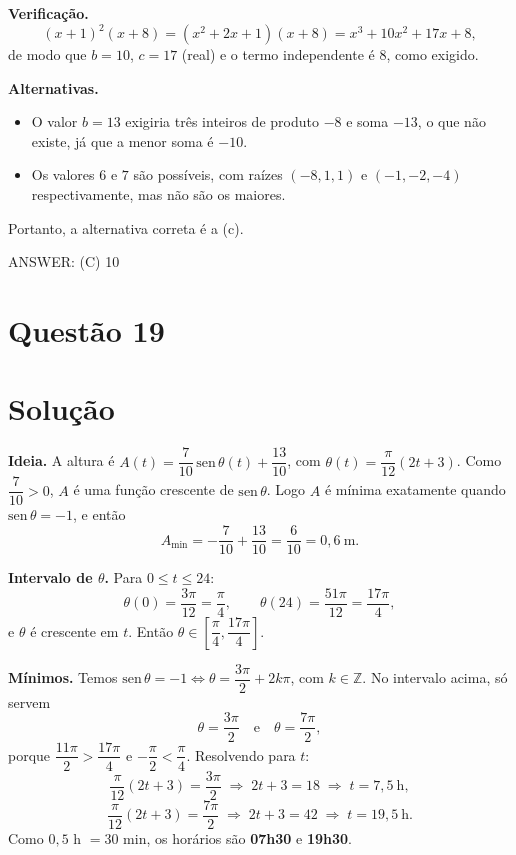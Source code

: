 \documentclass{article}%
\begin{document}
\textbf{Verificação.}
\[
(x+1)^2(x+8)=(x^2+2x+1)(x+8)=x^3+10x^2+17x+8,
\]
de modo que $b=10$, $c=17$ (real) e o termo independente é $8$, como exigido.

\textbf{Alternativas.}
\begin{itemize}
\item O valor $b=13$ exigiria três inteiros de produto $-8$ e soma $-13$, o que não existe, já que a menor soma é $-10$.
\item Os valores $6$ e $7$ são possíveis, com raízes $(-8,1,1)$ e $(-1,-2,-4)$ respectivamente, mas não são os maiores.
\end{itemize}
Portanto, a alternativa correta é a (c).

ANSWER: (C) 10%
\newpage%
\section*{Questão 19}

\section*{Solução}

\textbf{Ideia.} A altura é $A(t)=\dfrac{7}{10}\,\mathrm{sen}\,\theta(t)+\dfrac{13}{10}$, com $\theta(t)=\dfrac{\pi}{12}(2t+3)$. Como $\dfrac{7}{10}>0$, $A$ é uma função crescente de $\mathrm{sen}\,\theta$. Logo $A$ é mínima exatamente quando $\mathrm{sen}\,\theta=-1$, e então
\[
A_{\min}=-\frac{7}{10}+\frac{13}{10}=\frac{6}{10}=0{,}6\ \text{m}.
\]

\textbf{Intervalo de $\theta$.} Para $0\le t\le 24$:
\[
\theta(0)=\frac{3\pi}{12}=\frac{\pi}{4},\qquad \theta(24)=\frac{51\pi}{12}=\frac{17\pi}{4},
\]
e $\theta$ é crescente em $t$. Então $\theta\in\left[\dfrac{\pi}{4},\dfrac{17\pi}{4}\right]$.

\textbf{Mínimos.} Temos $\mathrm{sen}\,\theta=-1 \iff \theta=\dfrac{3\pi}{2}+2k\pi$, com $k\in\mathbb{Z}$. No intervalo acima, só servem
\[
\theta=\frac{3\pi}{2}\quad\text{e}\quad\theta=\frac{7\pi}{2},
\]
porque $\dfrac{11\pi}{2}>\dfrac{17\pi}{4}$ e $-\dfrac{\pi}{2}<\dfrac{\pi}{4}$. Resolvendo para $t$:
\[
\frac{\pi}{12}(2t+3)=\frac{3\pi}{2}\;\Rightarrow\;2t+3=18\;\Rightarrow\;t=7{,}5\ \text{h},
\]
\[
\frac{\pi}{12}(2t+3)=\frac{7\pi}{2}\;\Rightarrow\;2t+3=42\;\Rightarrow\;t=19{,}5\ \text{h}.
\]
Como $0{,}5$ h $=30$ min, os horários são \textbf{07h30} e \textbf{19h30}.
\end{document}
